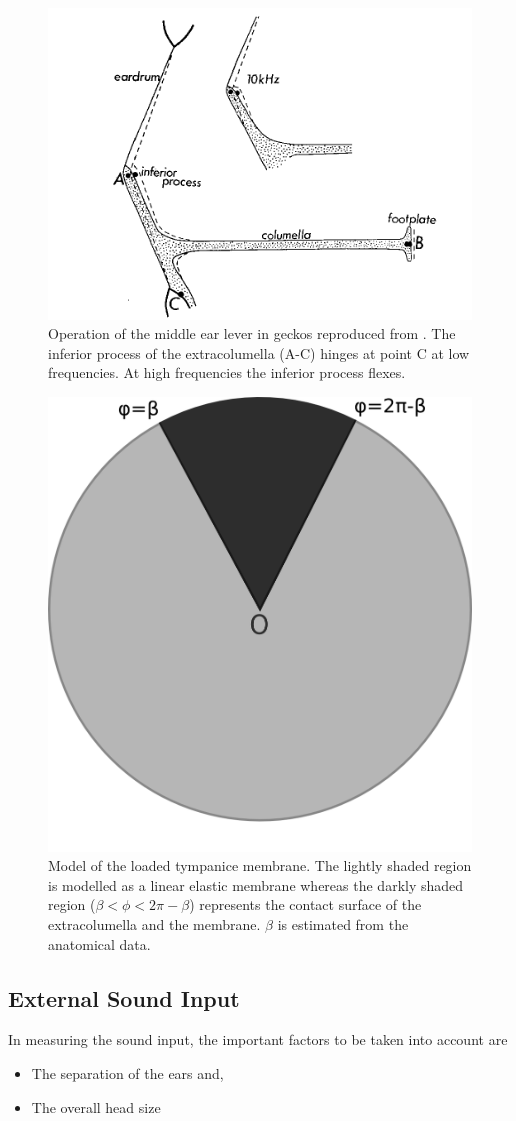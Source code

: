 \begin{figure}[ht]
 \centering
 \includegraphics[width=.7\linewidth]{Diagrams/manleyextracolumellaflection.png}
 \caption[Extracolumella Flection]{Operation of the middle ear lever in geckos reproduced from \cite{manleygecko2}. The inferior process of the extracolumella (A-C) 
 hinges at point C at low frequencies. At high frequencies the inferior process flexes.}
 \label{extracolumellaflection}
\end{figure}

\begin{figure}[ht]
 \centering
 \includegraphics[width=.4\linewidth]{Diagrams/extracolumella2.png}
 \caption[Tympanic membrane model]{Model of the loaded tympanice membrane. The lightly shaded region is modelled as a linear elastic membrane whereas the darkly shaded region 
 ($\beta<\phi<2\pi-\beta$) represents the contact surface of the extracolumella and the membrane. $\beta$ is estimated from the anatomical data.}
\end{figure}


\subsection{External Sound Input}
In measuring the sound input, the important factors to be taken into account are
\begin{itemize}
 \item The separation of the ears and,
 \item The overall head size
\end{itemize}

